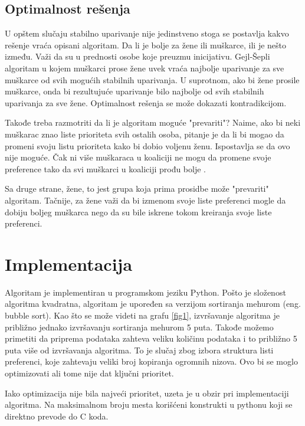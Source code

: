 \documentclass[a4paper]{article}
\begin{document}
\subsection{Optimalnost rešenja}
U opštem slučaju stabilno uparivanje nije jedinstveno stoga se postavlja kakvo rešenje vraća opisani algoritam. Da li je bolje za žene ili muškarce, ili je nešto između. Važi da su u prednosti osobe koje preuzmu inicijativu. Gejl-Šepli algoritam u kojem muškarci prose žene uvek vraća najbolje uparivanje za sve muškarce od svih mogućih stabilnih uparivanja. U suprotnom, ako bi žene prosile muškarce, onda bi rezultujuće uparivanje bilo najbolje od svih stabilnih uparivanja za sve žene. Optimalnost rešenja se može dokazati kontradikcijom.

Takođe treba razmotriti da li je algoritam moguće "prevariti"? Naime, ako bi neki muškarac znao liste prioriteta svih ostalih osoba, pitanje je da li bi mogao da promeni svoju listu prioriteta kako bi dobio voljenu ženu. Ispostavlja se da ovo nije moguće. Čak ni više muškaraca u koaliciji ne mogu da promene svoje preference tako da svi muškarci u koaliciji prođu bolje \cite{prevara}.

Sa druge strane, žene, to jest grupa koja prima prosidbe može "prevariti" algoritam. Tačnije, za žene važi da bi izmenom svoje liste preferenci mogle da dobiju boljeg muškarca nego da su bile iskrene tokom kreiranja svoje liste preferenci. 

\section{Implementacija}

Algoritam je implementiran u programskom jeziku Python. Pošto je složenost algoritma kvadratna, algoritam je upoređen sa verzijom sortiranja mehurom (eng. bubble sort). Kao što se može videti na grafu \ref{fig1}, izvršavanje algoritma je približno jednako izvršavanju sortiranja mehurom 5 puta. Takođe možemo primetiti da priprema podataka zahteva veliku količinu podataka i to približno 5 puta više od izvršavanja algoritma. To je slučaj zbog izbora struktura listi preferenci, koje zahtevaju veliki broj kopiranja ogromnih nizova. Ovo bi se moglo optimizovati ali tome nije dat ključni prioritet. 

Iako optimizacija nije bila najveći prioritet, uzeta je u obzir pri implementaciji algoritma. Na maksimalnom broju mesta korišćeni konstrukti u pythonu koji se direktno prevode do C koda. 
\end{document}
